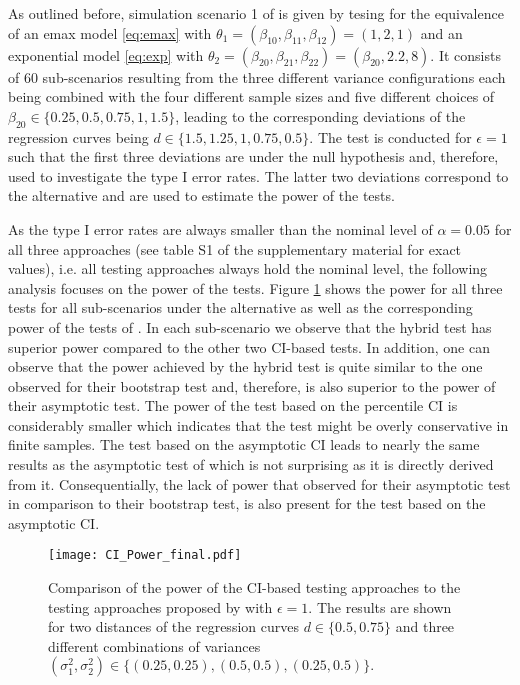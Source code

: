 {As outlined before, simulation scenario 1 of \citet{Dette2018} is given by tesing for the equivalence of an emax model \eqref{eq:emax}
with $\theta_1 = (\beta_{10}, \beta_{11}, \beta_{12}) = (1, 2, 1)$ and an exponential model \eqref{eq:exp}
with $\theta_2 = (\beta_{20}, \beta_{21}, \beta_{22}) = (\beta_{20}, 2.2, 8)$.
It consists of 60 sub-scenarios resulting from the three different variance configurations each being combined with the four different sample sizes and
five different choices of $\beta_{20} \in \{0.25, 0.5, 0.75, 1, 1.5\}$, leading to the corresponding deviations of the regression curves being $d \in \{1.5, 1.25, 1, 0.75, 0.5\}$.
The test is conducted for $\epsilon = 1$ such that the first three deviations are under the null hypothesis and, therefore, used to investigate the type I error rates. The latter two deviations correspond to the alternative and are used to estimate the power of the tests. 

As the type I error rates are always smaller than the nominal level of $\alpha = 0.05$ for all three approaches (see table S1 of the supplementary material for exact values), i.e. all testing approaches always hold the nominal level, the following analysis focuses on the power of the tests. 
Figure \ref{fig:CI_Power} shows the power for all three tests for all sub-scenarios under the alternative as well as the corresponding power of the tests of \cite{Dette2018}. In each sub-scenario we observe that the hybrid test has superior power compared to the other two CI-based tests. In addition, one can observe that the power achieved by the hybrid test is quite similar to the one \citet{Dette2018} observed for their bootstrap test and, therefore, is also superior to the power of their asymptotic test. The power of the test based on the percentile CI is considerably smaller which indicates that the test might be overly conservative in finite samples. The test based on the asymptotic CI leads to nearly the same results as the asymptotic test of \citet{Dette2018} which is not surprising as it is directly derived from it. Consequentially, the lack of power that \citet{Dette2018} observed for their asymptotic test in comparison to their bootstrap test, is also present for the test based on the asymptotic CI. 

\begin{figure}
        \centering
        \texttt{[image: CI\_Power\_final.pdf]} 
        \caption{Comparison of the power of the CI-based testing approaches to the testing approaches proposed by \citet{Dette2018} with $\epsilon = 1$. The results are shown for two distances of the regression curves $d \in \{0.5, 0.75\}$ and three different combinations of variances $(\sigma_1^2, \sigma_2^2) \in \{(0.25, 0.25), (0.5, 0.5), (0.25, 0.5)\}.$}
        \label{fig:CI_Power} 
\end{figure}

}
